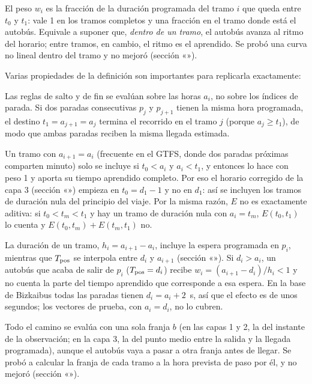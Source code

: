 El peso $w_i$ es la fracción de la duración programada del tramo $i$ que queda entre $t_0$ y $t_1$: vale 1 en los
tramos completos y una fracción en el tramo donde está el autobús. Equivale a suponer que, \emph{dentro de un tramo},
el autobús avanza al ritmo del horario; entre tramos, en cambio, el ritmo es el aprendido. Se probó una curva no lineal
dentro del tramo y no mejoró (sección «»).

Varias propiedades de la definición son importantes para replicarla exactamente:

\begin{observacion}
Las reglas de salto y de fin se evalúan sobre las horas $a_i$, no sobre los índices de parada. Si dos paradas
consecutivas $p_j$ y $p_{j+1}$ tienen la misma hora programada, el destino $t_1=a_{j+1}=a_j$ termina el recorrido en el
tramo $j$ (porque $a_j\ge t_1$), de modo que ambas paradas reciben la misma llegada estimada.
\end{observacion}

\begin{observacion}
Un tramo con $a_{i+1}=a_i$ (frecuente en el GTFS, donde dos paradas próximas comparten minuto) solo se incluye si
$t_0<a_i$ y $a_i<t_1$, y entonces lo hace con peso 1 y aporta su tiempo aprendido completo. Por eso el horario
corregido de la capa 3 (sección «») empieza en $t_0=d_1-1$ y no en $d_1$: así se incluyen los tramos de duración nula del
principio del viaje. Por la misma razón, $E$ no es exactamente aditiva: si $t_0<t_m<t_1$ y hay un tramo de duración
nula con $a_i=t_m$, $E(t_0,t_1)$ lo cuenta y $E(t_0,t_m)+E(t_m,t_1)$ no.
\end{observacion}

\begin{observacion}
La duración de un tramo, $h_i=a_{i+1}-a_i$, incluye la espera programada en $p_i$, mientras que $T_{\mathrm{pos}}$ se interpola
entre $d_i$ y $a_{i+1}$ (sección «»). Si $d_i>a_i$, un autobús que acaba de salir de $p_i$
($T_{\mathrm{pos}}=d_i$) recibe $w_i=(a_{i+1}-d_i)/h_i<1$ y no cuenta la parte del tiempo aprendido que corresponde a esa
espera. En la base de Bizkaibus todas las paradas tienen $d_i=a_i+2$~s, así que el efecto es de unos segundos; los
vectores de prueba, con $a_i=d_i$, no lo cubren.
\end{observacion}

\begin{observacion}
Todo el camino se evalúa con una sola franja $b$ (en las capas 1 y 2, la del instante de la observación; en la capa 3,
la del punto medio entre la salida y la llegada programada), aunque el autobús vaya a pasar a otra franja antes de
llegar. Se probó a calcular la franja de cada tramo a la hora prevista de paso por él, y no
mejoró (sección «»).
\end{observacion}

